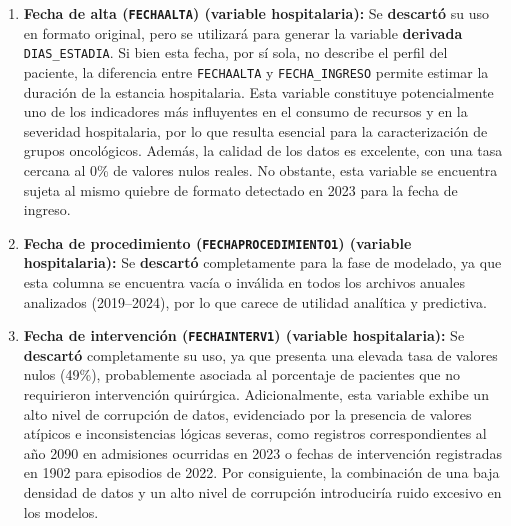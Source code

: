 \begin{enumerate}
    \item \textbf{Fecha de alta (\texttt{FECHAALTA}) (variable hospitalaria):} Se \textbf{descartó} su uso en formato original, pero se utilizará para generar la variable \textbf{derivada} \texttt{DIAS\_ESTADIA}. Si bien esta fecha, por sí sola, no describe el perfil del paciente, la diferencia entre \texttt{FECHAALTA} y \texttt{FECHA\_INGRESO} permite estimar la duración de la estancia hospitalaria. Esta variable constituye potencialmente uno de los indicadores más influyentes en el consumo de recursos y en la severidad hospitalaria, por lo que resulta esencial para la caracterización de grupos oncológicos. Además, la calidad de los datos es excelente, con una tasa cercana al 0\% de valores nulos reales. No obstante, esta variable se encuentra sujeta al mismo quiebre de formato detectado en 2023 para la fecha de ingreso.
    \item \textbf{Fecha de procedimiento (\texttt{FECHAPROCEDIMIENTO1}) (variable hospitalaria):} Se \textbf{descartó} completamente para la fase de modelado, ya que esta columna se encuentra vacía o inválida en todos los archivos anuales analizados (2019--2024), por lo que carece de utilidad analítica y predictiva. 
    \item \textbf{Fecha de intervención (\texttt{FECHAINTERV1}) (variable hospitalaria):} Se \textbf{descartó} completamente su uso, ya que presenta una elevada tasa de valores nulos (49\%), probablemente asociada al porcentaje de pacientes que no requirieron intervención quirúrgica. Adicionalmente, esta variable exhibe un alto nivel de corrupción de datos, evidenciado por la presencia de valores atípicos e inconsistencias lógicas severas, como registros correspondientes al año 2090 en admisiones ocurridas en 2023 o fechas de intervención registradas en 1902 para episodios de 2022. Por consiguiente, la combinación de una baja densidad de datos y un alto nivel de corrupción introduciría ruido excesivo en los modelos.
\end{enumerate}


